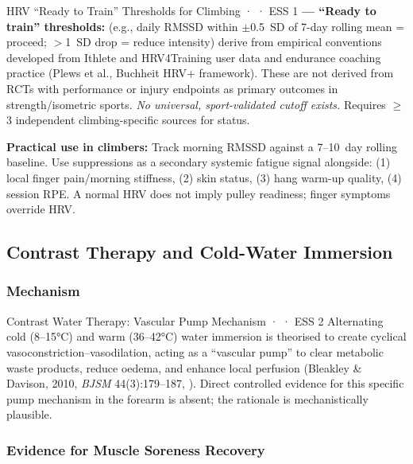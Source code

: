 \begin{toverifybox}{HRV ``Ready to Train'' Thresholds for Climbing · \toverify · ESS 1}
\textbf{\toverify --- ``Ready to train'' thresholds:} (e.g., daily RMSSD within $\pm$0.5~SD of 7-day rolling mean = proceed; $>$1~SD drop = reduce intensity) derive from empirical conventions developed from Ithlete and HRV4Training user data and endurance coaching practice (Plews et al., Buchheit HRV+ framework). These are not derived from RCTs with performance or injury endpoints as primary outcomes in strength/isometric sports. \emph{No universal, sport-validated cutoff exists.} Requires $\geq$3 independent climbing-specific sources for \folkloreverified status.
\end{toverifybox}

\textbf{Practical use in climbers:} Track morning RMSSD against a 7--10~day rolling baseline. Use suppressions as a secondary systemic fatigue signal alongside: (1) local finger pain/morning stiffness, (2) skin status, (3) hang warm-up quality, (4) session RPE. A normal HRV does not imply pulley readiness; finger symptoms override HRV.

\subsection{Contrast Therapy and Cold-Water Immersion}

\subsubsection*{Mechanism}

\begin{bioplausbox}{Contrast Water Therapy: Vascular Pump Mechanism · \bioplausible · ESS 2}
Alternating cold (8--15°C) and warm (36--42°C) water immersion is theorised to create cyclical vasoconstriction--vasodilation, acting as a ``vascular pump'' to clear metabolic waste products, reduce oedema, and enhance local perfusion (Bleakley \& Davison, 2010, \emph{BJSM} 44(3):179--187, \cite{BD09}). Direct controlled evidence for this specific pump mechanism in the forearm is absent; the rationale is mechanistically plausible.
\end{bioplausbox}

\subsubsection*{Evidence for Muscle Soreness Recovery}

